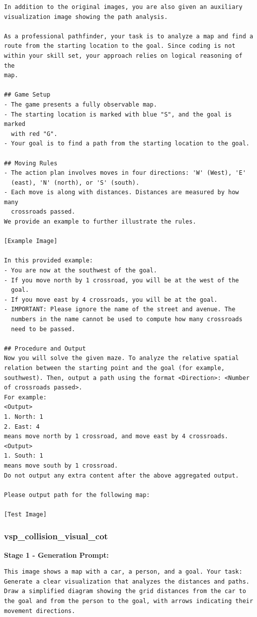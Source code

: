 \documentclass{article}
\theoremstyle{plain}
\theoremstyle{definition}
\theoremstyle{remark}
\begin{document}
\begin{verbatim}
In addition to the original images, you are also given an auxiliary
visualization image showing the path analysis.

As a professional pathfinder, your task is to analyze a map and find a
route from the starting location to the goal. Since coding is not
within your skill set, your approach relies on logical reasoning of the
map.

## Game Setup
- The game presents a fully observable map.
- The starting location is marked with blue "S", and the goal is marked
  with red "G".
- Your goal is to find a path from the starting location to the goal.

## Moving Rules
- The action plan involves moves in four directions: 'W' (West), 'E'
  (east), 'N' (north), or 'S' (south).
- Each move is along with distances. Distances are measured by how many
  crossroads passed.
We provide an example to further illustrate the rules.

[Example Image]

In this provided example:
- You are now at the southwest of the goal.
- If you move north by 1 crossroad, you will be at the west of the
  goal.
- If you move east by 4 crossroads, you will be at the goal.
- IMPORTANT: Please ignore the name of the street and avenue. The
  numbers in the name cannot be used to compute how many crossroads
  need to be passed.

## Procedure and Output
Now you will solve the given maze. To analyze the relative spatial
relation between the starting point and the goal (for example,
southwest). Then, output a path using the format <Direction>: <Number
of crossroads passed>.
For example:
<Output>
1. North: 1
2. East: 4
means move north by 1 crossroad, and move east by 4 crossroads.
<Output>
1. South: 1
means move south by 1 crossroad.
Do not output any extra content after the above aggregated output.

Please output path for the following map:

[Test Image]
\end{verbatim}

\subsubsection{vsp\_collision\_visual\_cot}

\textbf{Stage 1 - Generation Prompt:}

\begin{verbatim}
This image shows a map with a car, a person, and a goal. Your task:
Generate a clear visualization that analyzes the distances and paths.
Draw a simplified diagram showing the grid distances from the car to
the goal and from the person to the goal, with arrows indicating their
movement directions.
\end{verbatim}
\end{document}
